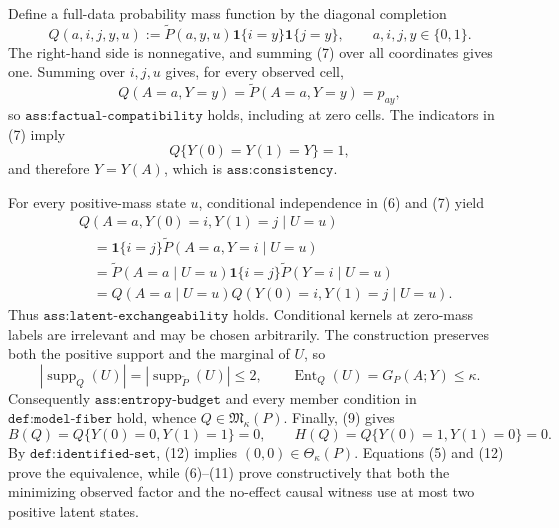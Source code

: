 Define a full-data probability mass function by the diagonal completion
\[
Q(a,i,j,y,u)
:=\widetilde P(a,y,u)\mathbf 1\{i=y\}\mathbf 1\{j=y\},
\qquad a,i,j,y\in\{0,1\}.
\tag{7}
\]
The right-hand side is nonnegative, and summing (7) over all coordinates gives one. Summing over \(i,j,u\) gives, for every observed cell,
\[
Q(A=a,Y=y)=\widetilde P(A=a,Y=y)=p_{ay},
\tag{8}
\]
so \(\texttt{ass:factual-compatibility}\) holds, including at zero cells. The indicators in (7) imply
\[
Q\{Y(0)=Y(1)=Y\}=1,
\tag{9}
\]
and therefore \(Y=Y(A)\), which is \(\texttt{ass:consistency}\).

For every positive-mass state \(u\), conditional independence in (6) and (7) yield
\[
\begin{aligned}
&Q(A=a,Y(0)=i,Y(1)=j\mid U=u)\\
&\quad=\mathbf 1\{i=j\}\widetilde P(A=a,Y=i\mid U=u)\\
&\quad=\widetilde P(A=a\mid U=u)
  \mathbf 1\{i=j\}\widetilde P(Y=i\mid U=u)\\
&\quad=Q(A=a\mid U=u)
  Q(Y(0)=i,Y(1)=j\mid U=u).
\end{aligned}
\tag{10}
\]
Thus \(\texttt{ass:latent-exchangeability}\) holds. Conditional kernels at zero-mass labels are irrelevant and may be chosen arbitrarily. The construction preserves both the positive support and the marginal of \(U\), so
\[
|\operatorname{supp}_{Q}(U)|
=|\operatorname{supp}_{\widetilde P}(U)|\leq2,
\qquad
\operatorname{Ent}_{Q}(U)=G_P(A;Y)\leq\kappa.
\tag{11}
\]
Consequently \(\texttt{ass:entropy-budget}\) and every member condition in \(\texttt{def:model-fiber}\) hold, whence \(Q\in\mathfrak M_\kappa(P)\). Finally, (9) gives
\[
B(Q)=Q\{Y(0)=0,Y(1)=1\}=0,
\qquad
H(Q)=Q\{Y(0)=1,Y(1)=0\}=0.
\tag{12}
\]
By \(\texttt{def:identified-set}\), (12) implies \((0,0)\in\Theta_\kappa(P)\). Equations (5) and (12) prove the equivalence, while (6)--(11) prove constructively that both the minimizing observed factor and the no-effect causal witness use at most two positive latent states.